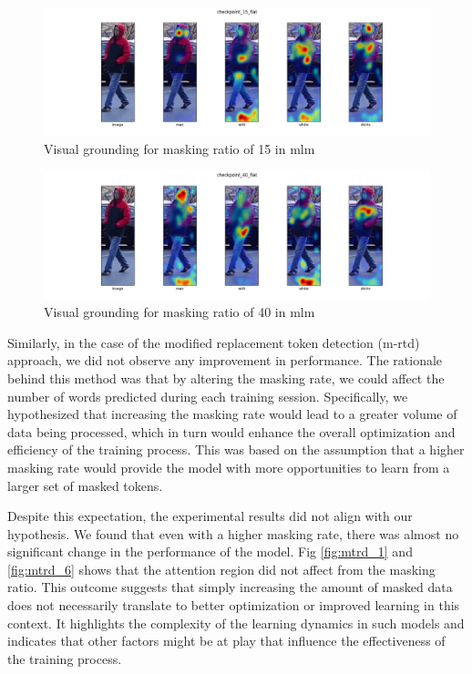 \begin{figure}[htbp]
  \includegraphics[width=\linewidth]{img/mlm2/mlm-checkpoint_15_flat.png}
  \caption{Visual grounding for masking ratio of 15 in \acrshort{mlm}}
  \label{fig:mlm_1}
\end{figure}

\begin{figure}[htbp]
  \includegraphics[width=\linewidth]{img/mlm2/mlm-checkpoint_40_flat.png}
  \caption{Visual grounding for masking ratio of 40 in \acrshort{mlm}}
  \label{fig:mlm_6}
\end{figure}

Similarly, in the case of the modified replacement token detection (m-rtd) approach, we did not observe any improvement in performance. The rationale behind this method was that by altering the masking rate, we could affect the number of words predicted during each training session. Specifically, we hypothesized that increasing the masking rate would lead to a greater volume of data being processed, which in turn would enhance the overall optimization and efficiency of the training process. This was based on the assumption that a higher masking rate would provide the model with more opportunities to learn from a larger set of masked tokens.

Despite this expectation, the experimental results did not align with our hypothesis. We found that even with a higher masking rate, there was almost no significant change in the performance of the model. Fig \ref{fig:mtrd_1} and \ref{fig:mtrd_6} shows that the attention region did not affect from the masking ratio. This outcome suggests that simply increasing the amount of masked data does not necessarily translate to better optimization or improved learning in this context. It highlights the complexity of the learning dynamics in such models and indicates that other factors might be at play that influence the effectiveness of the training process.


